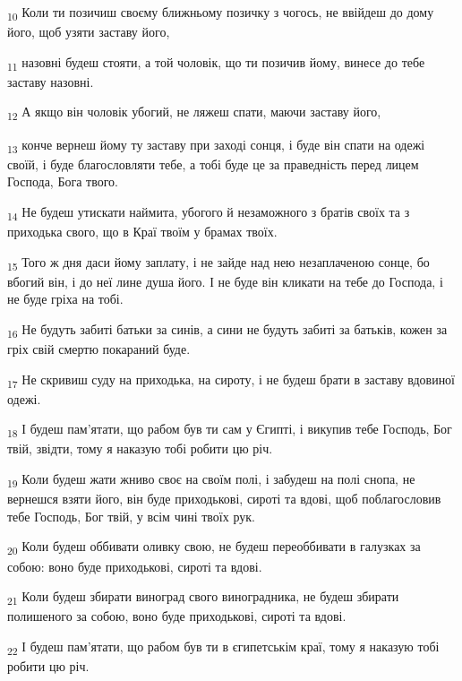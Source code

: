 \begin{tcolorbox}
\textsubscript{10} Коли ти позичиш своєму ближньому позичку з чогось, не ввійдеш до дому його, щоб узяти заставу його,
\end{tcolorbox}
\begin{tcolorbox}
\textsubscript{11} назовні будеш стояти, а той чоловік, що ти позичив йому, винесе до тебе заставу назовні.
\end{tcolorbox}
\begin{tcolorbox}
\textsubscript{12} А якщо він чоловік убогий, не ляжеш спати, маючи заставу його,
\end{tcolorbox}
\begin{tcolorbox}
\textsubscript{13} конче вернеш йому ту заставу при заході сонця, і буде він спати на одежі своїй, і буде благословляти тебе, а тобі буде це за праведність перед лицем Господа, Бога твого.
\end{tcolorbox}
\begin{tcolorbox}
\textsubscript{14} Не будеш утискати наймита, убогого й незаможного з братів своїх та з приходька свого, що в Краї твоїм у брамах твоїх.
\end{tcolorbox}
\begin{tcolorbox}
\textsubscript{15} Того ж дня даси йому заплату, і не зайде над нею незаплаченою сонце, бо вбогий він, і до неї лине душа його. І не буде він кликати на тебе до Господа, і не буде гріха на тобі.
\end{tcolorbox}
\begin{tcolorbox}
\textsubscript{16} Не будуть забиті батьки за синів, а сини не будуть забиті за батьків, кожен за гріх свій смертю покараний буде.
\end{tcolorbox}
\begin{tcolorbox}
\textsubscript{17} Не скривиш суду на приходька, на сироту, і не будеш брати в заставу вдовиної одежі.
\end{tcolorbox}
\begin{tcolorbox}
\textsubscript{18} І будеш пам'ятати, що рабом був ти сам у Єгипті, і викупив тебе Господь, Бог твій, звідти, тому я наказую тобі робити цю річ.
\end{tcolorbox}
\begin{tcolorbox}
\textsubscript{19} Коли будеш жати жниво своє на своїм полі, і забудеш на полі снопа, не вернешся взяти його, він буде приходькові, сироті та вдові, щоб поблагословив тебе Господь, Бог твій, у всім чині твоїх рук.
\end{tcolorbox}
\begin{tcolorbox}
\textsubscript{20} Коли будеш оббивати оливку свою, не будеш переоббивати в галузках за собою: воно буде приходькові, сироті та вдові.
\end{tcolorbox}
\begin{tcolorbox}
\textsubscript{21} Коли будеш збирати виноград свого виноградника, не будеш збирати полишеного за собою, воно буде приходькові, сироті та вдові.
\end{tcolorbox}
\begin{tcolorbox}
\textsubscript{22} І будеш пам'ятати, що рабом був ти в єгипетськім краї, тому я наказую тобі робити цю річ.
\end{tcolorbox}

